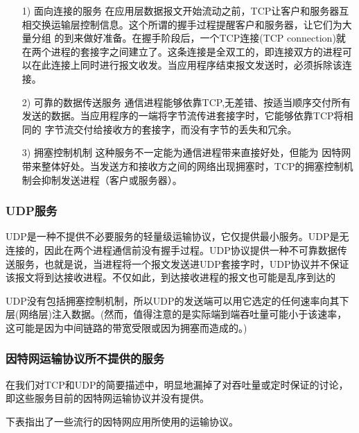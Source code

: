 \begin{itemize}
    \item [1)] 面向连接的服务
    \subitem 在应用层数据报文开始流动之前，TCP让客户和服务器互相交换运输层控制信息。这个所谓的握手过程提醒客户和服务器，让它们为大量分组 的到来做好准备。在握手阶段后，一个TCP连接(TCP connection)就在两个进程的套接字之间建立了。这条连接是全双工的，即连接双方的进程可以在此连接上同时进行报文收发。当应用程序结束报文发送时，必须拆除该连接。
    \item [2)] 可靠的数据传送服务
    \subitem 通信进程能够依靠TCP,无差错、按适当顺序交付所有发送的数据。当应用程序的一端将字节流传进套接字时，它能够依靠TCP将相同的 字节流交付给接收方的套接字，而没有字节的丢失和冗余。
    \item [3)] 拥塞控制机制
    \subitem 这种服务不一定能为通信进程带来直接好处，但能为 因特网带来整体好处。当发送方和接收方之间的网络出现拥塞时，TCP的拥塞控制机制会抑制发送进程（客户或服务器）。
\end{itemize}

\subsubsection{UDP服务}

    UDP是一种不提供不必要服务的轻量级运输协议，它仅提供最小服务。UDP是无连接的，因此在两个进程通信前没有握手过程。UDP协议提供一种不可靠数据传送服务，也就是说，当进程将一个报文发送进UDP套接字时，UDP协议并不保证该报文将到达接收进程。不仅如此，到达接收进程的报文也可能是乱序到达的

    UDP没有包括拥塞控制机制，所以UDP的发送端可以用它选定的任何速率向其下层(网络层)注入数据。(然而，值得注意的是实际端到端吞吐量可能小于该速率，这可能是因为中间链路的带宽受限或因为拥塞而造成的。)

\subsubsection{因特网运输协议所不提供的服务}

    在我们对TCP和UDP的简要描述中，明显地漏掉了对吞吐量或定时保证的讨论，即这些服务目前的因特网运输协议并没有提供。

    下表指出了一些流行的因特网应用所使用的运输协议。

